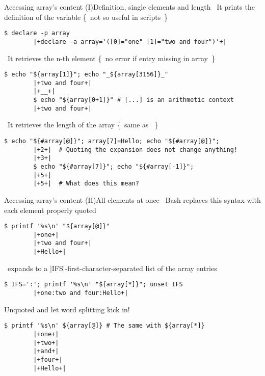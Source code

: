 \begin{frame}[fragile]{Accessing array's content (I)}{Definition, single elements and length}
    \vspace{-2mm}\centering
    \, It prints the definition of the variable {\tiny\{~not so useful in scripts~\}}
    \smallskip
    \begin{lstlisting}[style=MyBash, numbers=none]
        $ declare -p array
        |+declare -a array='([0]="one" [1]="two and four")'+|
    \end{lstlisting}
    \medskip
    \, It retrieves the n-th element {\tiny\{~no error if entry missing in array~\}}
    \smallskip
    \begin{lstlisting}[style=MyBash, numbers=none]
        $ echo "${array[1]}"; echo "_${array[3156]}_"
        |+two and four+|
        |+__+|
        $ echo "${array[0+1]}" # [...] is an arithmetic context
        |+two and four+|
    \end{lstlisting}
    \medskip
    \, It retrieves the length of the array {\tiny\{~same as ~\}}
    \smallskip
    \begin{lstlisting}[style=MyBash, numbers=none]
        $ echo "${#array[@]}"; array[7]=Hello; echo "${#array[@]}";
        |+2+|  # Quoting the expansion does not change anything!
        |+3+|
        $ echo "${#array[7]}"; echo "${#array[-1]}";
        |+5+|
        |+5+|  # What does this mean?
    \end{lstlisting}
\end{frame}
\begin{frame}[fragile]{Accessing array's content (II)}{All elements at once}
    \vspace{-2mm}\centering
    \, Bash replaces this syntax with each element properly quoted
    \smallskip
    \begin{lstlisting}[style=MyBash, numbers=none]
        $ printf '%s\n' "${array[@]}"
        |+one+|
        |+two and four+|
        |+Hello+|
    \end{lstlisting}
    \medskip
    \, expands to a \bash|IFS|-first-character-separated list of the array entries
    \smallskip
    \begin{lstlisting}[style=MyBash, numbers=none]
        $ IFS=':'; printf '%s\n' "${array[*]}"; unset IFS
        |+one:two and four:Hello+|
    \end{lstlisting}
    \medskip
    Unquoted  and  let \alert{word splitting} kick in!
    \smallskip
    \begin{lstlisting}[style=MyBash, numbers=none]
        $ printf '%s\n' ${array[@]} # The same with ${array[*]}
        |+one+|
        |+two+|
        |+and+|
        |+four+|
        |+Hello+|
    \end{lstlisting}
\end{frame}
